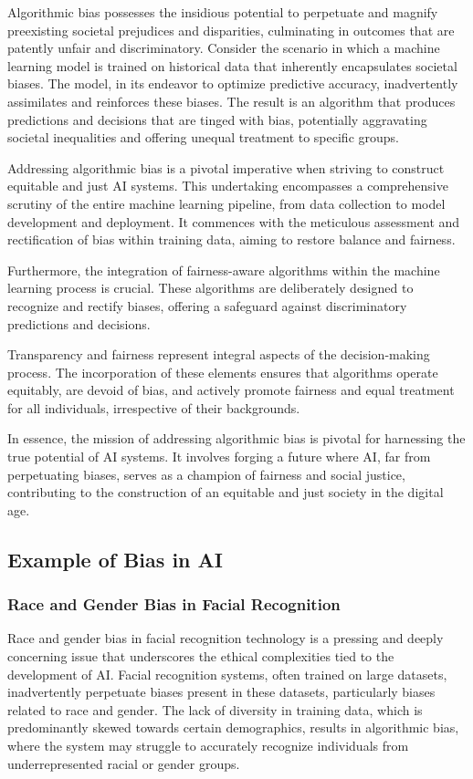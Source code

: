 \documentclass[12pt,a4paper,openright,twoside]{book}
\begin{document}
Algorithmic bias possesses the insidious potential to perpetuate and magnify preexisting societal prejudices and disparities, culminating in outcomes that are patently unfair and discriminatory. Consider the scenario in which a machine learning model is trained on historical data that inherently encapsulates societal biases. The model, in its endeavor to optimize predictive accuracy, inadvertently assimilates and reinforces these biases. The result is an algorithm that produces predictions and decisions that are tinged with bias, potentially aggravating societal inequalities and offering unequal treatment to specific groups. \cite{10.1145/2983270} 

Addressing algorithmic bias is a pivotal imperative when striving to construct equitable and just AI systems. This undertaking encompasses a comprehensive scrutiny of the entire machine learning pipeline, from data collection to model development and deployment. It commences with the meticulous assessment and rectification of bias within training data, aiming to restore balance and fairness. 

Furthermore, the integration of fairness-aware algorithms within the machine learning process is crucial. These algorithms are deliberately designed to recognize and rectify biases, offering a safeguard against discriminatory predictions and decisions. 

Transparency and fairness represent integral aspects of the decision-making process. The incorporation of these elements ensures that algorithms operate equitably, are devoid of bias, and actively promote fairness and equal treatment for all individuals, irrespective of their backgrounds. 

In essence, the mission of addressing algorithmic bias is pivotal for harnessing the true potential of AI systems. It involves forging a future where AI, far from perpetuating biases, serves as a champion of fairness and social justice, contributing to the construction of an equitable and just society in the digital age.


\subsection{Example of Bias in AI}
\subsubsection{Race and Gender Bias in Facial Recognition} \cite{https://doi.org/10.5281/zenodo.4050457}
Race and gender bias in facial recognition technology is a pressing and deeply concerning issue that underscores the ethical complexities tied to the development of AI. Facial recognition systems, often trained on large datasets, inadvertently perpetuate biases present in these datasets, particularly biases related to race and gender. The lack of diversity in training data, which is predominantly skewed towards certain demographics, results in algorithmic bias, where the system may struggle to accurately recognize individuals from underrepresented racial or gender groups. 
\end{document}
